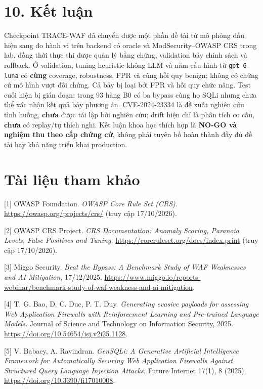 \documentclass[
  10pt,
  a4paper,
]{article}
\begin{document}
\section{10. Kết luận}\label{kux1ebft-luux1eadn}

Checkpoint TRACE-WAF đã chuyển được một phần đề tài từ mô phỏng dấu hiệu
sang đo hành vi trên backend có oracle và ModSecurity--OWASP CRS trong
lab, đồng thời thực thi được quản lý bằng chứng, validation bảy chính
sách và rollback. Ở validation, tuning heuristic không LLM và năm cấu
hình từ \texttt{gpt-6-luna} có \textbf{cùng} coverage, robustness, FPR
và cùng hồi quy benign; không có chứng cứ mô hình vượt đối chứng. Cả bảy
bị loại bởi FPR và hồi quy chức năng. Test cuối hiện bị gián đoạn: trong
93 hàng B0 có ba bypass cùng họ SQLi nhưng chưa thể xác nhận kết quả bảy
phương án. CVE-2024-23334 là đề xuất nghiên cứu tình huống,
\textbf{chưa} được tái lập bởi nghiên cứu; drift hiện chỉ là phân tích
cơ cấu, \textbf{chưa} có replay/tự thích nghi. Kết luận khoa học thích
hợp là \textbf{NO-GO và nghiệm thu theo cấp chứng cứ}, không phải tuyên
bố hoàn thành đầy đủ đề tài hay khả năng triển khai production.

\section{Tài liệu tham khảo}\label{tuxe0i-liux1ec7u-tham-khux1ea3o}

{[}1{]} OWASP Foundation. \emph{OWASP Core Rule Set (CRS).}
\url{https://owasp.org/projects/crs/} (truy cập 17/10/2026).

{[}2{]} OWASP CRS Project. \emph{CRS Documentation: Anomaly Scoring,
Paranoia Levels, False Positives and Tuning.}
\url{https://coreruleset.org/docs/index.print} (truy cập 17/10/2026).

{[}3{]} Miggo Security. \emph{Beat the Bypass: A Benchmark Study of WAF
Weaknesses and AI Mitigation}, 17/12/2025.
\url{https://www.miggo.io/reports-webinar/benchmark-study-of-waf-weakness-and-ai-mitigation}.

{[}4{]} T. G. Bao, D. C. Duc, P. T. Duy. \emph{Generating evasive
payloads for assessing Web Application Firewalls with Reinforcement
Learning and Pre-trained Language Models.} Journal of Science and
Technology on Information Security, 2025.
\url{https://doi.org/10.54654/isj.v2i25.1128}.

{[}5{]} V. Babaey, A. Ravindran. \emph{GenSQLi: A Generative Artificial
Intelligence Framework for Automatically Securing Web Application
Firewalls Against Structured Query Language Injection Attacks.} Future
Internet 17(1), 8 (2025). \url{https://doi.org/10.3390/fi17010008}.
\end{document}

